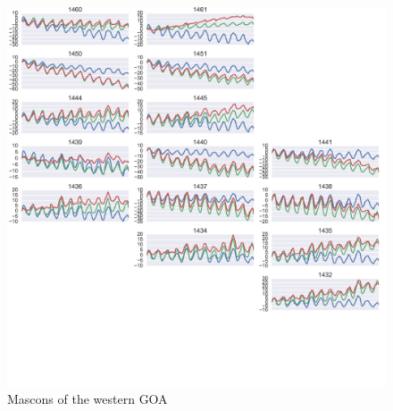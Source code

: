 \documentclass[review,oneside]{igs}
\begin{document}
\begin{figure}
\noindent\includegraphics[width=178mm]{figures/southeasternPlot} \centering \caption{Mascons of the western GOA} \label{fig:summer}
\end{figure}

\end{document}
